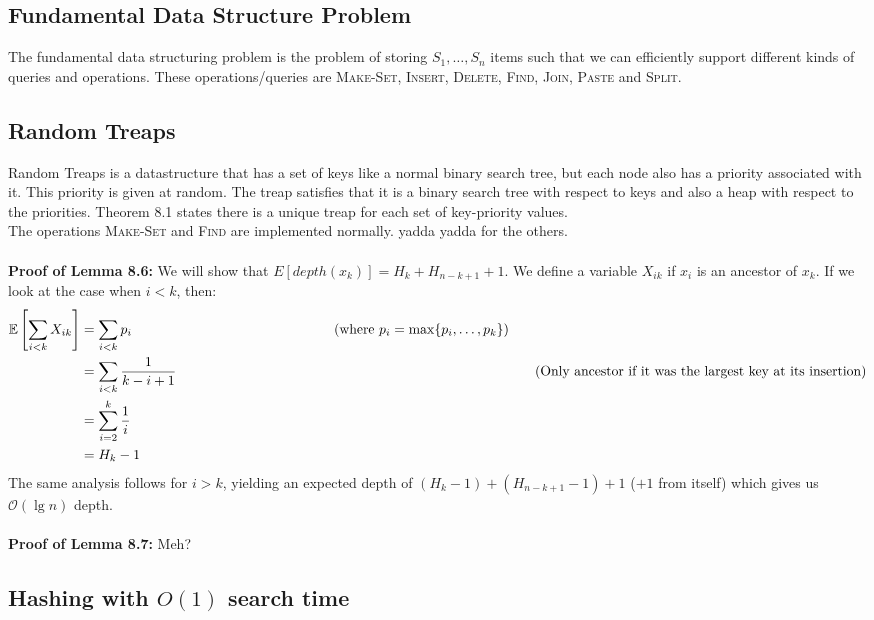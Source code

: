 \documentclass[a4paper, fleqn]{article}
\newcommand{\comment}[1]{%
  \text{\phantom{(#1)}} \tag{#1}}
\begin{document}
\subsection*{Fundamental Data Structure Problem}
The fundamental data structuring problem is the problem of storing $S_1,\ldots,S_n$ items such that we can efficiently support different kinds of queries and operations. These operations/queries are \textsc{Make-Set}, \textsc{Insert}, \textsc{Delete}, \textsc{Find}, \textsc{Join}, \textsc{Paste} and \textsc{Split}.

\subsection*{Random Treaps}
Random Treaps is a datastructure that has a set of keys like a normal binary search tree, but each node also has a priority associated with it. This priority is given at random. The treap satisfies that it is a binary search tree with respect to keys and also a heap with respect to the priorities. Theorem 8.1 states there is a unique treap for each set of key-priority values. \\
The operations \textsc{Make-Set} and \textsc{Find} are implemented normally. yadda yadda for the others. \\
\\
\textbf{Proof of Lemma 8.6:} We will show that $E[depth(x_k)]=H_k+H_{n-k+1}+1$. We define a variable $X_{ik}$ if $x_i$ is an ancestor of $x_k$. If we look at the case when $i<k$, then:
\begin{align*}
  \mathbb{E}\left[ \sum_{i<k} X_{ik} \right] &= \sum_{i<k} p_i \comment{where $p_i=\max\{p_i,\ldots, p_k\}$} \\
                                             &= \sum_{i<k} \frac{1}{k-i+1} \comment{Only ancestor if it was the largest key at its insertion}\\
                                     &= \sum_{i=2}^k \frac{1}{i} \\
                                     &= H_k-1
\end{align*}
The same analysis follows for $i>k$, yielding an expected depth of $(H_k-1)+(H_{n-k+1}-1)+1$ ($+1$ from itself) which gives us $\mathcal{O}(\lg n)$ depth.\\
\\
\textbf{Proof of Lemma 8.7:} Meh?

\subsection*{Hashing with $O(1)$ search time}
\end{document}
